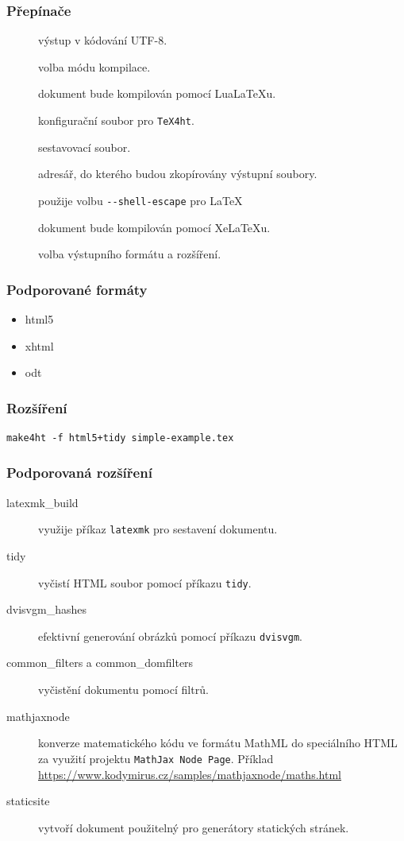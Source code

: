 \begin{frame}[fragile]
  \frametitle{Přepínače}
\begin{description}
  \item[] výstup v kódování UTF-8.
  \item[] volba módu kompilace.
  \item[] dokument bude kompilován pomocí Lua\LaTeX u.
  \item[] konfigurační soubor pro \texttt{TeX4ht}. 
  \item[] sestavovací soubor.
  \item[] adresář, do kterého budou zkopírovány výstupní soubory.
  \item[] použije volbu \verb|--shell-escape| pro \LaTeX
  \item[] dokument bude kompilován pomocí Xe\LaTeX u.
  \item[] volba výstupního formátu a rozšíření.
\end{description}

\end{frame}

\begin{frame}
  \frametitle{Podporované formáty}
  \begin{itemize}
    \item html5
    \item xhtml
    \item odt
  \end{itemize}
\end{frame}

\begin{frame}[fragile]
  \frametitle{Rozšíření}
  \begin{priklad}
\begin{verbatim}
make4ht -f html5+tidy simple-example.tex
\end{verbatim}
\end{priklad}
\end{frame}
\begin{frame}
  \frametitle{Podporovaná rozšíření}
\begin{description}
  \item[latexmk\_build] využije příkaz \texttt{latexmk} pro sestavení
    dokumentu.
  \item[tidy] vyčistí HTML soubor pomocí příkazu \texttt{tidy}.
  \item[dvisvgm\_hashes] efektivní generování obrázků pomocí příkazu
    \texttt{dvisvgm}. 
  \item[common\_filters a common\_domfilters] vyčistění dokumentu pomocí filtrů. 
  \item[mathjaxnode] konverze matematického kódu ve formátu MathML do
    speciálního HTML za využití projektu \texttt{MathJax Node
    Page}. Příklad \url{https://www.kodymirus.cz/samples/mathjaxnode/maths.html}
  \item[staticsite]  vytvoří dokument použitelný pro generátory statických
    stránek.
\end{description}
\end{frame}

